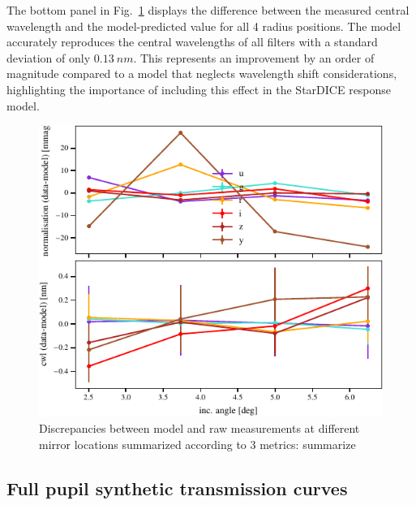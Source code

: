 The bottom panel in Fig.~\ref{fig:metrics} displays the difference
between the measured central wavelength and the model-predicted value
for all 4 radius positions. The model accurately reproduces the
central wavelengths of all filters with a standard deviation of only
$\SI{0.13}{nm}$. This represents an improvement by an order of
magnitude compared to a model that neglects wavelength shift
considerations, highlighting the importance of including this effect
in the StarDICE response model.

\begin{figure}
  \centering
  \includegraphics[width=1\linewidth]{fig/metrics.pdf}
  \caption{Discrepancies between model and raw measurements at different mirror locations summarized according to 3 metrics: summarize}
  \label{fig:metrics}
\end{figure}

\subsection{Full pupil synthetic transmission curves}

